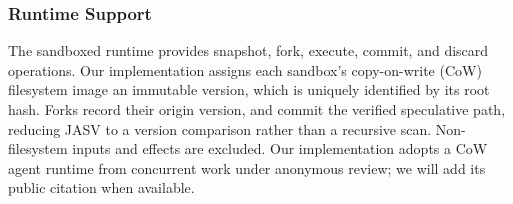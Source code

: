 \subsubsection{Runtime Support}

The sandboxed runtime provides snapshot, fork, execute, commit, and discard operations. Our
implementation assigns each sandbox's copy-on-write (CoW) filesystem image an immutable version, which is uniquely identified by its root hash. 
Forks record their origin version, and commit the verified speculative path, reducing JASV to a
version comparison rather than a recursive scan. Non-filesystem inputs and effects are excluded.
%
Our implementation adopts a CoW agent runtime from concurrent work under
anonymous review; we will add its public citation when available.